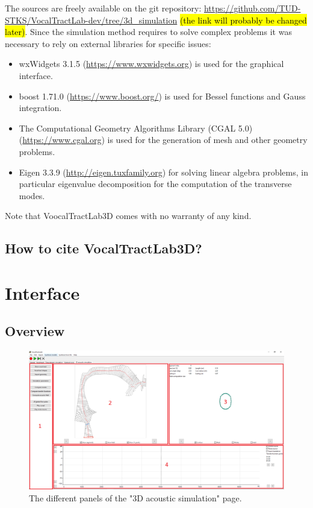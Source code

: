 \documentclass[]{article}
\begin{document}
	The sources are freely available on the git repository: 
	\url{https://github.com/TUD-STKS/VocalTractLab-dev/tree/3d_simulation}
	\hl{(the link will probably be changed later)}.	
	Since the simulation method requires to solve complex problems it was necessary to 
	rely on external libraries for specific issues:
	\begin{itemize}
		\item wxWidgets 3.1.5 (\url{https://www.wxwidgets.org}) 
		is used for the graphical interface.
		\item boost 1.71.0 (\url{https://www.boost.org/}) is used for Bessel functions
		and Gauss integration.
		\item The Computational Geometry Algorithms Library (CGAL 5.0) 
		(\url{https://www.cgal.org})
		is used for the generation of mesh and other geometry problems.
		\item Eigen 3.3.9 (\url{http://eigen.tuxfamily.org}) for solving linear algebra problems, in particular
		eigenvalue decomposition for the computation of the transverse modes.
	\end{itemize}

	Note that VoocalTractLab3D comes with no warranty of any kind.
	
	\subsection{How to cite VocalTractLab3D?}
	
	
	\section{Interface}
	
	\subsection{Overview}
	
	\begin{figure}[h!]
		\centering
		\includegraphics[scale=0.35]{acoustic_3d_simu_page.png}
		\caption{The different panels of the "3D acoustic simulation" page.}
		\label{figure:acoustic_3d_simu_page}
	\end{figure}
	
\end{document}
